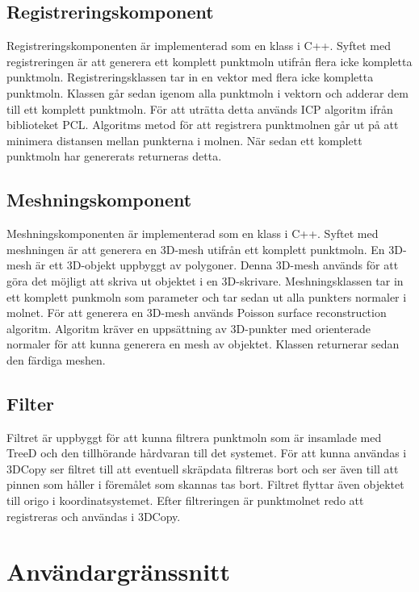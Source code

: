 \documentclass[a4paper,titlepage,12pt]{article}
\begin{document}
	\subsection{Registreringskomponent}
		Registreringskomponenten är implementerad som en klass i C++. Syftet med registreringen är att generera ett komplett punktmoln utifrån flera icke kompletta punktmoln. Registreringsklassen tar in en vektor med flera icke kompletta punktmoln. Klassen går sedan igenom alla punktmoln i vektorn och adderar dem till ett komplett punktmoln. För att uträtta detta används ICP algoritm ifrån biblioteket PCL. Algoritms metod för att registrera punktmolnen går ut på att minimera distansen mellan punkterna i molnen. När sedan ett komplett punktmoln har genererats returneras detta.
	
	\subsection{Meshningskomponent}
		Meshningskomponenten är implementerad som en klass i C++. Syftet med meshningen är att generera en 3D-mesh utifrån ett komplett punktmoln. En 3D-mesh är ett 3D-objekt uppbyggt av polygoner. Denna 3D-mesh används för att göra det möjligt att skriva ut objektet i en 3D-skrivare. Meshningsklassen tar in ett komplett punkmoln som parameter och tar sedan ut alla punkters normaler i molnet. För att generera en 3D-mesh används Poisson surface reconstruction algoritm. Algoritm kräver en uppsättning av 3D-punkter med orienterade normaler för att kunna generera en mesh av objektet. Klassen returnerar sedan den färdiga meshen.
	
	\subsection{Filter}
		Filtret är uppbyggt för att kunna filtrera punktmoln som är insamlade med TreeD och den tillhörande hårdvaran till det systemet. För att kunna användas i 3DCopy ser filtret till att eventuell skräpdata filtreras bort och ser även till att pinnen som håller i föremålet som skannas tas bort. Filtret flyttar även objektet till origo i koordinatsystemet. Efter filtreringen är punktmolnet redo att registreras och användas i 3DCopy.
		
\newpage
 
\section{Användargränssnitt}
\end{document}
